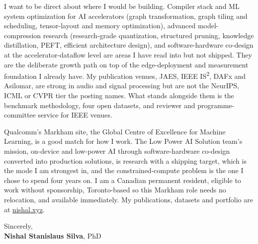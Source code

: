 \documentclass[11pt]{article}
\newcommand{\clName}{Nishal Stanislaus Silva}
\newcommand{\clSite}{https://nishal.xyz}
\begin{document}
I want to be direct about where I would be building. Compiler stack and ML system optimization for AI accelerators (graph transformation, graph tiling and scheduling, tensor-layout and memory optimization), advanced model-compression research (research-grade quantization, structured pruning, knowledge distillation, PEFT, efficient architecture design), and software-hardware co-design at the accelerator-dataflow level are areas I have read into but not shipped. They are the deliberate growth path on top of the edge-deployment and measurement foundation I already have. My publication venues, JAES, IEEE IS\textsuperscript{2}, DAFx and Asilomar, are strong in audio and signal processing but are not the NeurIPS, ICML or CVPR tier the posting names. What stands alongside them is the benchmark methodology, four open datasets, and reviewer and programme-committee service for IEEE venues.

Qualcomm's Markham site, the Global Centre of Excellence for Machine Learning, is a good match for how I work. The Low Power AI Solution team's mission, on-device and low-power AI through software-hardware co-design converted into production solutions, is research with a shipping target, which is the mode I am strongest in, and the constrained-compute problem is the one I chose to spend four years on. I am a Canadian permanent resident, eligible to work without sponsorship, Toronto-based so this Markham role needs no relocation, and available immediately. My publications, datasets and portfolio are at \href{\clSite}{nishal.xyz}.

\vspace{10pt}
Sincerely,\\[2pt]
\textbf{\clName}, PhD
\end{document}
